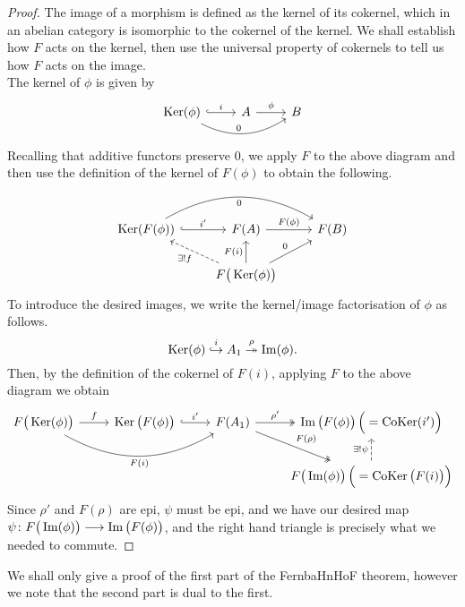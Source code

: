 \documentclass[a4paper]{article}
\def\into{\hookrightarrow}
\def\epi{\twoheadrightarrow}
\begin{document}
\begin{proof}
    The image of a morphism is defined as the kernel of its cokernel, which in an abelian category is isomorphic to the cokernel of the kernel. We shall establish how $F$ acts on the kernel, then use the universal property of cokernels to tell us how $F$ acts on the image.\\
    The kernel of $\phi$ is given by
    \[
        \begin{tikzcd}
            \Ker(\phi) \arrow[r, "i", hook] \arrow[rr, "0", bend right] & A \arrow[r, "\phi"] & B
        \end{tikzcd}
    \]
    Recalling that additive functors preserve $0$, we apply $F$ to the above diagram and then use the definition of the kernel of $F(\phi)$ to obtain the following.
    \[
        \begin{tikzcd}
            \Ker(F(\phi)) \arrow[r, "i'", hook] \arrow[rr, "0"', bend left] & F(A) \arrow[r, "F(\phi)"] & F(B) \\
                & F\big(\Ker(\phi)\big) \arrow[ul, "\exists ! f", dashed] \arrow[ur, "0"] \arrow[u, "F(i)"]&
        \end{tikzcd}
    \]
    To introduce the desired images, we write the kernel/image factorisation of $\phi$ as follows.
    \[
        \Ker(\phi) \stackrel{i}{\into} A_1 \stackrel{\rho}{\epi} \im(\phi).
    \]
    Then, by the definition of the cokernel of $F(i)$, applying $F$ to the above diagram we obtain
    \[
        \begin{tikzcd}
            F\big( \Ker(\phi) \big) \arrow[r, "f"] \arrow[rr, "F(i)"', bend right] & \Ker\big( F(\phi) \big) \arrow[r, "i'", hook] & F(A_1) \arrow[r, "\rho'", two heads] \arrow[rd, "F(\rho)", two heads] & \im\big(F(\phi)\big)\,  \Big(= \CoKer(i') \Big)\\
            & & & F\big(\im(\phi)\big)\, \Big( = \CoKer\big( F(i) \big)\Big) \arrow[u, "\exists! \psi", dashed]
        \end{tikzcd}
    \]
    Since $\rho'$ and $F(\rho)$ are epi, $\psi$ must be epi, and we have our desired map $\psi\colon F\big(\operatorname{Im}(\phi)\big)\longrightarrow \operatorname{Im}\big(F(\phi)\big)$, and the right hand triangle is precisely what we needed to commute.
\end{proof}
We shall only give a proof of the first part of the FernbaHnHoF theorem, however we note that the second part is dual to the first.
\end{document}
